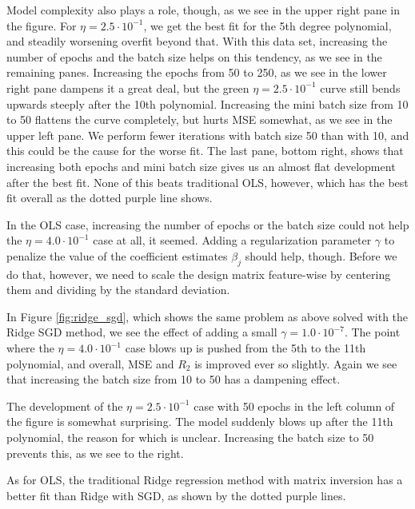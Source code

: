 \documentclass[]{article}
\begin{document}
Model complexity also plays a role, though, as we see in the upper right pane in the figure. For $\eta = 2.5 \cdot 10^{-1}$, we get the best fit for the 5th degree polynomial, and steadily worsening overfit beyond that. With this data set, increasing the number of epochs and the batch size helps on this tendency, as we see in the remaining panes. Increasing the epochs from 50 to 250, as we see in the lower right pane dampens it a great deal, but the green $\eta = 2.5 \cdot 10^{-1}$ curve still bends upwards steeply after the 10th polynomial. Increasing the mini batch size from 10 to 50 flattens the curve completely, but hurts MSE somewhat, as we see in the upper left pane. We perform fewer iterations with batch size 50 than with 10, and this could be the cause for the worse fit. The last pane, bottom right, shows that increasing both epochs and mini batch size gives us an almost flat development after the best fit. None of this beats traditional OLS, however, which has the best fit overall as the dotted purple line shows.

\vspace{5mm}

In the OLS case, increasing the number of epochs or the batch size could not help the $\eta = 4.0 \cdot 10^{-1}$ case at all, it seemed. Adding a regularization parameter $\gamma$ to penalize the value of the coefficient estimates $\beta_j$ should help, though. Before we do that, however, we need to scale the design matrix feature-wise by centering them and dividing by the standard deviation.

In Figure \ref{fig:ridge_sgd}, which shows the same problem as above solved with the Ridge SGD method, we see the effect of adding a small $\gamma = 1.0 \cdot 10 ^{-7}$. The point where the $\eta = 4.0 \cdot 10^{-1}$ case blows up is pushed from the 5th to the 11th polynomial, and overall, MSE and $R_2$ is improved ever so slightly. Again we see that increasing the batch size from 10 to 50 has a dampening effect.

The development of the $\eta = 2.5 \cdot 10^{-1}$ case with 50 epochs in the left column of the figure is somewhat surprising. The model suddenly blows up after the 11th polynomial, the reason for which is unclear. Increasing the batch size to 50 prevents this, as we see to the right.

As for OLS, the traditional Ridge regression method with matrix inversion has a better fit than Ridge with SGD, as shown by the dotted purple lines.

\vspace{5mm}
\end{document}
